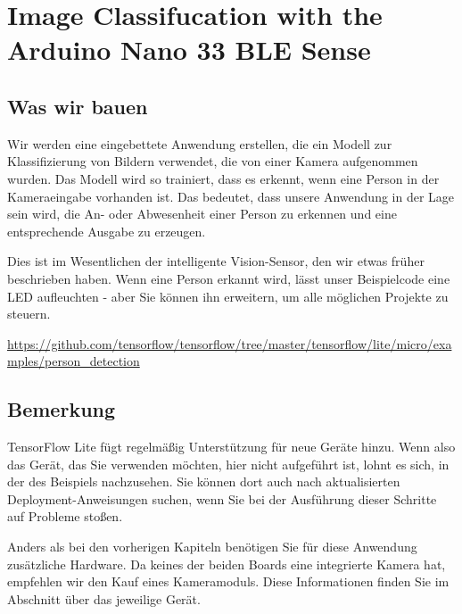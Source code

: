 %
%





\chapter{Image Classifucation with the Arduino Nano 33 BLE Sense}



\section{Was wir bauen}

Wir werden eine eingebettete Anwendung erstellen, die ein Modell zur Klassifizierung von Bildern verwendet, die von einer Kamera aufgenommen wurden. Das Modell wird so trainiert, dass es erkennt, wenn eine Person in der Kameraeingabe vorhanden ist. Das bedeutet, dass unsere Anwendung in der Lage sein wird, die An- oder Abwesenheit einer Person zu erkennen und eine entsprechende Ausgabe zu erzeugen.

Dies ist im Wesentlichen der intelligente Vision-Sensor, den wir etwas früher beschrieben haben. Wenn eine Person erkannt wird, lässt unser Beispielcode eine LED aufleuchten - aber Sie können ihn erweitern, um alle möglichen Projekte zu steuern.

\url{https://github.com/tensorflow/tensorflow/tree/master/tensorflow/lite/micro/examples/person_detection}


\section{Bemerkung}

TensorFlow Lite fügt regelmäßig Unterstützung für neue Geräte hinzu. Wenn also das Gerät, das Sie verwenden möchten, hier nicht aufgeführt ist, lohnt es sich, in der  des Beispiels nachzusehen. Sie können dort auch nach aktualisierten Deployment-Anweisungen suchen, wenn Sie bei der Ausführung dieser Schritte auf Probleme stoßen.


Anders als bei den vorherigen Kapiteln benötigen Sie für diese Anwendung zusätzliche Hardware. Da keines der beiden Boards eine integrierte Kamera hat, empfehlen wir den Kauf eines Kameramoduls. Diese Informationen finden Sie im Abschnitt über das jeweilige Gerät.


